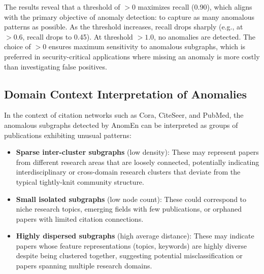 \documentclass[10pt,twocolumn,a4paper]{article}
\begin{document}
\begin{table}[ht]
\centering
\caption{Effect of Combined Score Threshold on Anomaly Detection (Cora)}
\label{tab:ablation_score}
\end{table}

The results reveal that a threshold of $> 0$ maximizes recall (0.90), which aligns with the primary objective of anomaly detection: to capture as many anomalous patterns as possible. As the threshold increases, recall drops sharply (e.g., at $> 0.6$, recall drops to 0.45). At threshold $> 1.0$, no anomalies are detected. The choice of $> 0$ ensures maximum sensitivity to anomalous subgraphs, which is preferred in security-critical applications where missing an anomaly is more costly than investigating false positives.

\subsection{Domain Context Interpretation of Anomalies}

In the context of citation networks such as Cora, CiteSeer, and PubMed, the anomalous subgraphs detected by AnomEn can be interpreted as groups of publications exhibiting unusual patterns:

\begin{itemize}
    \item \textbf{Sparse inter-cluster subgraphs} (low density): These may represent papers from different research areas that are loosely connected, potentially indicating interdisciplinary or cross-domain research clusters that deviate from the typical tightly-knit community structure.
    
    \item \textbf{Small isolated subgraphs} (low node count): These could correspond to niche research topics, emerging fields with few publications, or orphaned papers with limited citation connections.
    
    \item \textbf{Highly dispersed subgraphs} (high average distance): These may indicate papers whose feature representations (topics, keywords) are highly diverse despite being clustered together, suggesting potential misclassification or papers spanning multiple research domains.
\end{itemize}
\end{document}
